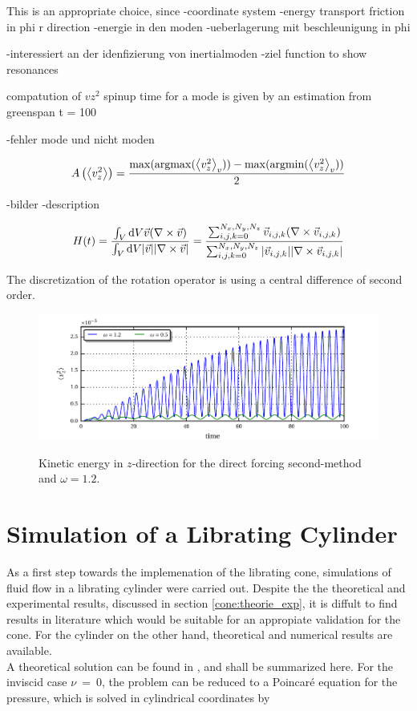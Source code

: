 This is an appropriate choice, since
-coordinate system
-energy transport friction in phi r direction
-energie in den moden
-ueberlagerung mit beschleunigung in phi

-interessiert an der idenfizierung von inertialmoden
-ziel function
 to show resonances


compatution of $vz^2$
spinup time for a mode is given by an estimation from greenspan t = 100

-fehler mode und nicht moden

\begin{align}
    A\left(\left<v_z^2\right>\right) = \frac{\max(\operatorname*{argmax}(\left<v_z^2\right>_{v})) - \max(\operatorname*{argmin}(\left<v_z^2\right>_{v}))}{2}
\end{align}

-bilder
-description

\begin{align}
H(t) = \frac{\int_V \mathop{}\!\mathrm{d} V \vec{v} (\nabla \times \vec{v})}{\int_V \mathop{}\!\mathrm{d} V |\vec{v}||\nabla \times \vec{v}|}
 = \frac{\sum_{i,j,k=0}^{N_x, N_y, N_z} \vec{v}_{i,j,k} (\nabla \times \vec{v}_{i, j, k})}
 {\sum_{i,j,k=0}^{N_x, N_y, N_z}|\vec{v}_{i,j,k}|| \nabla \times \vec{v}_{i, j, k}|}
\end{align}

The discretization of the rotation operator is using a central difference of second order.


\begin{figure}[!pb]
  \includegraphics{gfx/cone/cylinder/cyl_vz.pdf}\label{fig:cone:cyl_vzmode}
  \caption{Kinetic energy in $z$-direction for the direct forcing second-method and $\omega=1.2$.}
\end{figure}
\clearpage


\section{Simulation of a Librating Cylinder}
\label{cone:sec:lib_cylinder}

As a first step towards the implemenation of the librating cone,
simulations of fluid flow in a librating cylinder were carried out.
Despite the the theoretical and experimental results, discussed in section \ref{cone:theorie_exp},
it is diffult to find results in literature which would be suitable for an appropiate validation for the cone.
For the cylinder on the other hand, theoretical and numerical results are available.\\
A theoretical solution can be found in \citep{Greenspan1990}, and shall be summarized here.
For the inviscid case $\nu~=~0$, the problem can be reduced to a Poincar\'{e} equation for the pressure,
which is solved in cylindrical coordinates by

